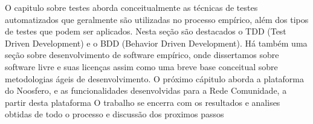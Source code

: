 	O capitulo sobre testes aborda conceitualmente as técnicas de testes automatizados que geralmente
	são utilizadas no processo empírico, além dos tipos de testes que podem ser aplicados. Nesta seção são 
	destacados o TDD (Test Driven Development) e o BDD (Behavior Driven Development).
	Há também uma seção sobre desenvolvimento de software empírico, onde dissertamos sobre software livre 
	e suas licenças assim como uma breve base conceitual sobre metodologias ágeis de desenvolvimento.
	O próximo cápitulo aborda a plataforma do Noosfero, e as funcionalidades desenvolvidas para a Rede Comunidade,
	a partir desta plataforma
	O trabalho se encerra com os resultados e analises obtidas de todo o processo e discussão dos proximos passos


